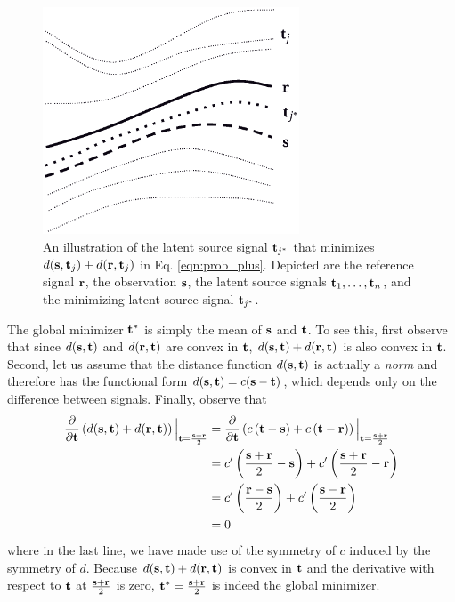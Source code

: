 \begin{figure}[h!]
\begin{center}
\includegraphics[width=3in]{latentsources}
\end{center}
\caption{\label{fig:conv_comb} An illustration of the latent source signal
  $\mathbf t_{j^*}$ that minimizes $d(\mathbf s,\mathbf t_j) + d(\mathbf r,\mathbf t_j)$ in
  Eq. \ref{eqn:prob_plus}. Depicted are the reference signal $\mathbf r$, the
  observation $\mathbf s$, the latent source signals $\mathbf t_1, \dots, \mathbf t_n$, and the
  minimizing latent source signal $\mathbf t_{j^*}$.}
\end{figure}

The global minimizer $\mathbf t^*$ is simply the mean of $\mathbf s$ and $\mathbf t$. To see
this, first observe that since $d(\mathbf s,\mathbf t)$ and $d(\mathbf r, \mathbf t)$ are convex
in $\mathbf t$, $d(\mathbf s,\mathbf t) + d(\mathbf r,\mathbf t)$ is also convex in $\mathbf t$. Second,
let us assume that the distance function $d(\mathbf s,\mathbf t)$ is actually a {\em
  norm} and therefore has the functional form $d(\mathbf s,\mathbf t) = c(\mathbf s-\mathbf t)$,
which depends only on the difference between signals. Finally, observe that
\begin{align}
\frac{\partial}{\partial \mathbf t} \left(d(\mathbf s,\mathbf t) + d(\mathbf r,\mathbf t)\right)\Big|_{\mathbf t = \frac{\mathbf s + \mathbf r}{2}}
&= \frac{\partial}{\partial \mathbf t}\left(c\left(\mathbf t - \mathbf s\right) + c\left(\mathbf t-\mathbf r\right)\right)\Big|_{\mathbf t = \frac{\mathbf s + \mathbf r}{2}}\notag\\
&= c'\left(\frac{\mathbf s+\mathbf r}{2} - \mathbf s\right) + c'\left(\frac{\mathbf s+\mathbf r}{2}-\mathbf r\right)\notag\\
&= c'\left(\frac{\mathbf r-\mathbf s}{2}\right) + c'\left(\frac{\mathbf s-\mathbf r}{2}\right)\notag\\
&= 0
\end{align}
where in the last line, we have made use of the symmetry of $c$ induced by the
symmetry of $d$. Because $d(\mathbf s, \mathbf t) + d(\mathbf r, \mathbf t)$ is convex in $\mathbf
t$ and the derivative with respect to $\mathbf t$ at $\frac{\mathbf s + \mathbf r}{2}$ is
zero, $\mathbf t^* = \frac{\mathbf s + \mathbf r}{2}$ is indeed the global minimizer.

